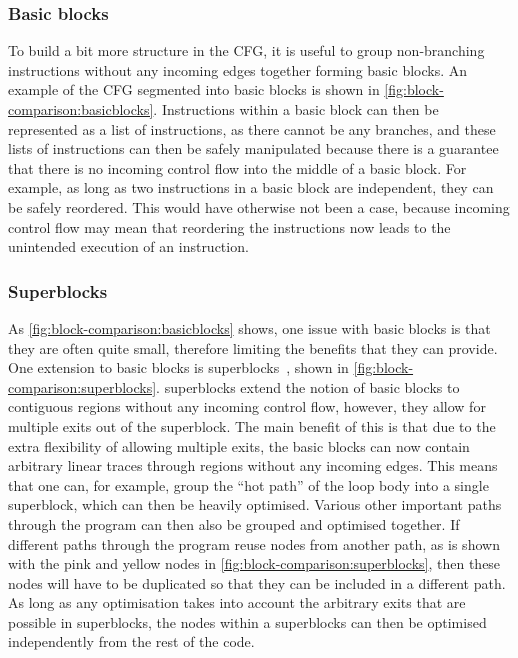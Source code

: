 \subsubsection{Basic blocks}

To build a bit more structure in the \gls{CFG}, it is useful to group
non-branching instructions without any incoming edges together forming
\glspl{basic block}.  An example of the \gls{CFG} segmented into
\glspl{basic block} is shown in \cref{fig:block-comparison:basicblocks}.
Instructions within a \gls{basic block} can then be represented as a list of
instructions, as there cannot be any branches, and these lists of instructions
can then be safely manipulated because there is a guarantee that there is no
incoming control flow into the middle of a \gls{basic block}.  For example, as
long as two instructions in a \gls{basic block} are independent, they can be
safely reordered.  This would have otherwise not been a case, because incoming
control flow may mean that reordering the instructions now leads to the
unintended execution of an instruction.

\subsubsection{Superblocks}

As \cref{fig:block-comparison:basicblocks} shows, one issue with
\glspl{basic block} is that they are often quite small, therefore limiting the
benefits that they can provide. One extension to \glspl{basic block} is
\glspl{superblock}~\cite[]{hwu93_super}, shown in
\cref{fig:block-comparison:superblocks}.  \Glspl{superblock} extend the notion
of \glspl{basic block} to contiguous regions without any incoming control flow,
however, they allow for multiple exits out of the \gls{superblock}.  The main
benefit of this is that due to the extra flexibility of allowing multiple exits,
the \glspl{basic block} can now contain arbitrary linear traces through regions
without any incoming edges.  This means that one can, for example, group the
\enquote{hot path} of the loop body into a single \gls{superblock}, which can
then be heavily optimised.  Various other important paths through the program
can then also be grouped and optimised together.  If different paths through the
program reuse nodes from another path, as is shown with the pink and yellow
nodes in \cref{fig:block-comparison:superblocks}, then these nodes will have to
be duplicated so that they can be included in a different path.  As long as any
optimisation takes into account the arbitrary exits that are possible in
\glspl{superblock}, the nodes within a \glspl{superblock} can then be optimised
independently from the rest of the code.

